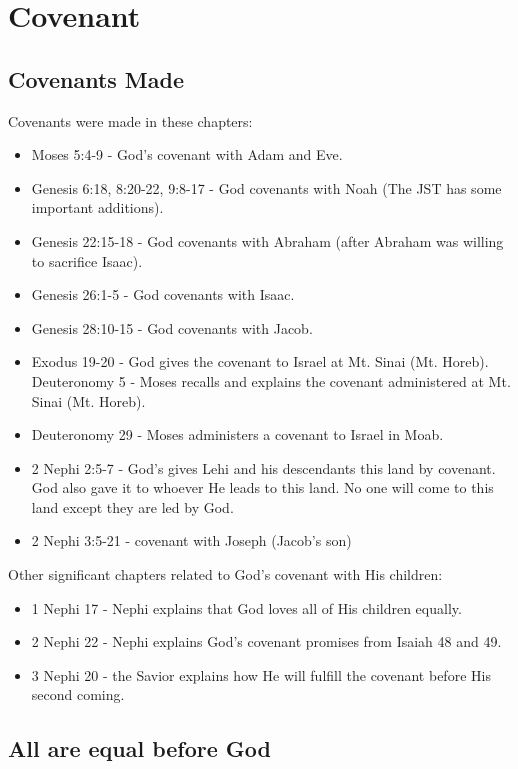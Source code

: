 \chapter{Covenant}


\section{Covenants Made}

Covenants were made in these chapters:
\begin{itemize}
  \item Moses 5:4-9 - God's covenant with Adam and Eve.
  \item Genesis 6:18, 8:20-22, 9:8-17 - God covenants with Noah (The JST has some important additions).
  \item Genesis 22:15-18 - God covenants with Abraham (after Abraham was willing to sacrifice Isaac).
  \item Genesis 26:1-5 - God covenants with Isaac.
  \item Genesis 28:10-15 - God covenants with Jacob.
  \item Exodus 19-20 - God gives the covenant to Israel at Mt. Sinai (Mt. Horeb).
  \subitem Deuteronomy 5 - Moses recalls and explains the covenant administered at Mt. Sinai (Mt. Horeb).
  \item Deuteronomy 29 - Moses administers a covenant to Israel in Moab.
  \item 2 Nephi 2:5-7 - God's gives Lehi and his descendants this land by covenant.
  \subitem God also gave it to whoever He leads to this land.
  \subitem No one will come to this land except they are led by God.
  \item 2 Nephi 3:5-21 - covenant with Joseph (Jacob's son)
\end{itemize}

Other significant chapters related to God's covenant with His children:
\begin{itemize}
  \item 1 Nephi 17 - Nephi explains that God loves all of His children equally.
  \item 2 Nephi 22 - Nephi explains God's covenant promises from Isaiah 48 and 49.
  \item 3 Nephi 20 - the Savior explains how He will fulfill the covenant before His second coming.
\end{itemize}


\section{All are equal before God}

